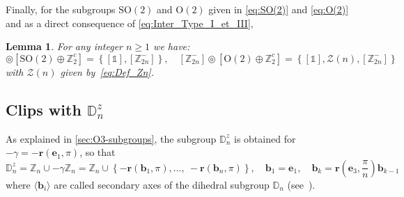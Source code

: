 \documentclass[11pt,a4paper]{amsart}
\newtheorem{lem}[thm]{Lemma}
\theoremstyle{definition}
\newcommand{\ZZ}{\mathbb{Z}}                %
\newcommand{\OO}{\mathrm{O}}                %
\newcommand{\SO}{\mathrm{SO}}               %
\newcommand{\octa}{\mathbb{O}}              %
\newcommand{\ico}{\mathbb{I}}               %
\newcommand{\DD}{\mathbb{D}}                %
\newcommand{\1}{\mathds{1}}		            %
\newcommand{\ee}{\pmb{e}}                   %
\newcommand{\vR}{\mathbf{r}}
\newcommand{\bs}{\mathbf{s}}
\newcommand{\be}{\mathbf{e}}
\newcommand{\bb}{\mathbf{b}}
\newcommand{\set}[1]{\left\{#1\right\}}     %
\newcommand{\Dnz}{\DD_n^z}
\begin{document}

Finally, for the subgroups $\SO(2)$ and $\OO(2)$ given in \eqref{eq:SO(2)} and \eqref{eq:O(2)} and as a direct consequence of \eqref{eq:Inter_Type_I_et_III},

\begin{lem}
  For any integer $n\geq 1$ we have:
  \begin{equation*}
    [\ZZ_{2n}^-]\circledcirc [\SO(2)\oplus \ZZ_2^c]=\set{[\1],[\ZZ_{2n}^-]},\quad 	[\ZZ_{2n}^-]\circledcirc [\OO(2)\oplus \ZZ_2^c]=\set{[\1],\mathcal{Z}(n),[\ZZ_{2n}^-]}
  \end{equation*}
  with $\mathcal{Z}(n)$ given by~\eqref{eq:Def_Zn}.
\end{lem}


\subsection{Clips with $\Dnz$}
\label{sec:withDnz}
As explained in \autoref{sec:O3-subgroups}, the subgroup $\Dnz$ is obtained for $-\gamma=-\vR(\be_1,\pi)$, so that
\begin{equation*}
  \Dnz=\ZZ_n \cup -\gamma \ZZ_n=\ZZ_n\cup \set{-\vR(\bb_1,\pi),\dotsc,\ -\vR(\bb_n,\pi)}, \quad \bb_1=\ee_1,\quad \bb_k=\vR\left(\ee_3,\frac{\pi}{n}\right)\bb_{k-1}
\end{equation*}
where $\langle \bb_i \rangle$ are called secondary axes of the dihedral subgroup $\DD_n$ (see~\cite[Appendix A]{Olive2019}).
\end{document}
